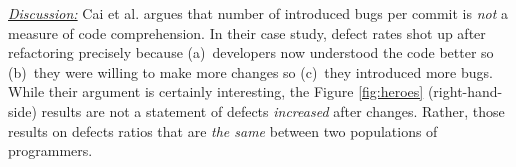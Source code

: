\documentclass[sigconf,review,anonymous]{acmart}
\begin{document}





\noindent \textit{\underline{Discussion:}} 
Cai et al. \cite{cai19_debt} argues that number of introduced bugs
per commit is {\em not} a measure of code comprehension.
In their case study, defect rates shot up after refactoring
precisely because (a)~developers now understood the code better so (b)~they were willing to make more changes so (c)~they
introduced more bugs. While their argument is certainly interesting, the Figure \ref{fig:heroes} (right-hand-side) results
are not a statement of defects {\em increased} after changes.
Rather, those results on defects ratios that are {\em the same} between two populations of programmers. 
\end{document}
